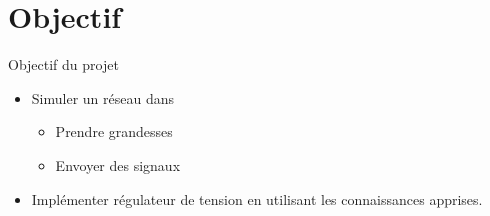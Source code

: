\section{Objectif}
\begin{frame}{Objectif du projet}
\begin{itemize}
	\item Simuler un réseau dans \powerfactory \pause
	\begin{itemize}
		\item Prendre grandesses\pause
		\item Envoyer des signaux\pause
	\end{itemize}
	\item Implémenter régulateur de tension en utilisant les connaissances apprises.
\end{itemize}
\end{frame}

